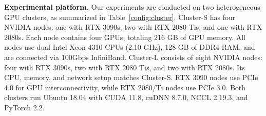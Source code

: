 \documentclass[conference]{IEEEtran}
\begin{document}
\textbf{Experimental platform.} Our experiments are conducted on two heterogeneous GPU clusters, as summarized in Table~\ref{config:cluster}. 
Cluster-S has four NVIDIA nodes: one with RTX 3090s, two with RTX 2080 Tis, and one with RTX 2080s. Each node contains four GPUs, totaling 216 GB of GPU memory. All nodes use dual Intel Xeon 4310 CPUs (2.10 GHz), 128 GB of DDR4 RAM, and are connected via 100Gbps InfiniBand.
Cluster-L consists of eight NVIDIA nodes: four with RTX 3090s, two with RTX 2080 Tis, and two with RTX 2080s. Its CPU, memory, and network setup matches Cluster-S. RTX 3090 nodes use PCIe 4.0 for GPU interconnectivity, while RTX 2080/Ti nodes use PCIe 3.0. Both clusters run Ubuntu 18.04 with CUDA 11.8, cuDNN 8.7.0, NCCL 2.19.3, and PyTorch 2.2.
\end{document}
